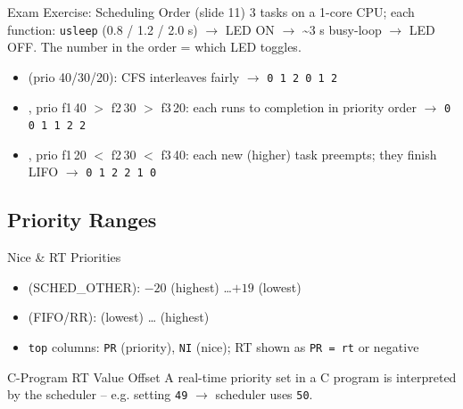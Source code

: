\multend

\begin{example2}{Exam Exercise: Scheduling Order (slide 11)}
    3 tasks on a 1-core CPU; each function: \texttt{usleep} (0.8 / 1.2 / 2.0 s) $\to$
    LED ON $\to$ \textasciitilde3 s busy-loop $\to$ LED OFF. The
    number in the order = which LED toggles.
    \tcblower
    \begin{itemize}
        \item {} (prio 40/30/20):
              CFS interleaves fairly $\to$ \texttt{0 1 2 0 1 2}
        \item {}, prio f1\,40 $>$ f2\,30
              $>$ f3\,20: each runs to completion in priority order $\to$
              \texttt{0 0 1 1 2 2}
        \item {}, prio f1\,20 $<$ f2\,30
              $<$ f3\,40: each new (higher) task preempts; they finish LIFO $\to$
              \texttt{0 1 2 2 1 0}
    \end{itemize}
\end{example2}

\subsection{Priority Ranges}


\begin{definition}{Nice \& RT Priorities}
    \begin{itemize}
        \item {} (SCHED\_OTHER): $-20$ (highest) \dots $+19$ (lowest)
        \item {} (FIFO/RR):  (lowest) \dots
               (highest)
        \item \texttt{top} columns: \texttt{PR} (priority), \texttt{NI} (nice);
              RT shown as \texttt{PR = rt} or negative
    \end{itemize}
\end{definition}

\begin{corollary}{C-Program RT Value Offset}
    A real-time priority set in a C program is interpreted  by the
    scheduler -- e.g. setting \texttt{49} $\to$ scheduler uses \texttt{50}.
\end{corollary}

